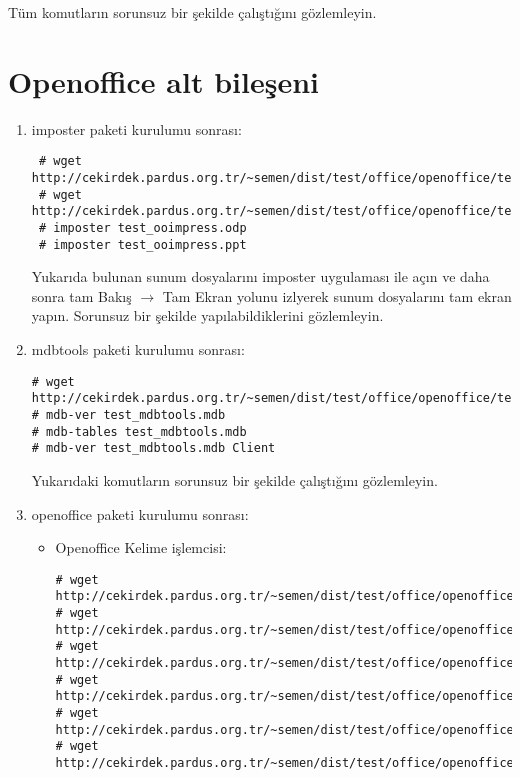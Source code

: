 \documentclass[a4paper,10pt]{article}
\begin{document}
\begin{enumerate}
\begin{verbatim}
\end{verbatim}

Tüm komutların sorunsuz bir şekilde çalıştığını gözlemleyin.


\end{enumerate}
\section{Openoffice alt bileşeni}
\begin{enumerate}
 \item imposter paketi kurulumu sonrası:
\begin{verbatim}
 # wget http://cekirdek.pardus.org.tr/~semen/dist/test/office/openoffice/test_ooimpress.odp
 # wget http://cekirdek.pardus.org.tr/~semen/dist/test/office/openoffice/test_ooimpress.ppt
 # imposter test_ooimpress.odp
 # imposter test_ooimpress.ppt
\end{verbatim}
Yukarıda bulunan sunum dosyalarını imposter uygulaması ile açın ve daha sonra tam Bakış $\rightarrow$ Tam Ekran yolunu izlyerek sunum dosyalarını tam ekran yapın. Sorunsuz bir şekilde yapılabildiklerini gözlemleyin.

 \item mdbtools paketi kurulumu sonrası:
\begin{verbatim}
# wget http://cekirdek.pardus.org.tr/~semen/dist/test/office/openoffice/test_mdbtools.mdb
# mdb-ver test_mdbtools.mdb
# mdb-tables test_mdbtools.mdb
# mdb-ver test_mdbtools.mdb Client
\end{verbatim}

Yukarıdaki komutların sorunsuz bir şekilde çalıştığını gözlemleyin.

\item openoffice paketi kurulumu sonrası:
\begin{itemize}
\item Openoffice Kelime işlemcisi:
\begin{verbatim}
# wget http://cekirdek.pardus.org.tr/~semen/dist/test/office/openoffice/test_oowriter.doc
# wget http://cekirdek.pardus.org.tr/~semen/dist/test/office/openoffice/test_oowriter.odt
# wget http://cekirdek.pardus.org.tr/~semen/dist/test/office/openoffice/test_oowriter.sxw
# wget http://cekirdek.pardus.org.tr/~semen/dist/test/office/openoffice/test_oowriter.txt
# wget http://cekirdek.pardus.org.tr/~semen/dist/test/office/openoffice/test_oowriter.ott
# wget http://cekirdek.pardus.org.tr/~semen/dist/test/office/openoffice/test_oowriter.html
\end{verbatim}


\end{itemize}
\end{enumerate}
\end{document}
